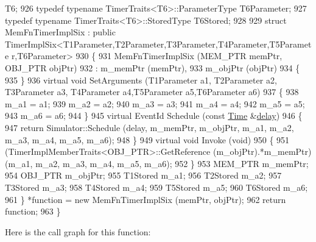 \begin{DoxyCode}
       T6;
926   \textcolor{keyword}{typedef} \textcolor{keyword}{typename} TimerTraits<T6>::ParameterType T6Parameter;
927   \textcolor{keyword}{typedef} \textcolor{keyword}{typename} TimerTraits<T6>::StoredType T6Stored;
928 
929   \textcolor{keyword}{struct }MemFnTimerImplSix : \textcolor{keyword}{public} TimerImplSix<T1Parameter,T2Parameter,T3Parameter,T4Parameter,T5Paramete
      r,T6Parameter>
930   \{
931     MemFnTimerImplSix (MEM\_PTR memPtr, OBJ\_PTR objPtr)
932       : m\_memPtr (memPtr),
933         m\_objPtr (objPtr)
934     \{
935     \}
936     \textcolor{keyword}{virtual} \textcolor{keywordtype}{void} SetArguments (T1Parameter a1, T2Parameter a2, T3Parameter a3, T4Parameter a4,T5Parameter 
      a5,T6Parameter a6)
937     \{
938       m\_a1 = a1;
939       m\_a2 = a2;
940       m\_a3 = a3;
941       m\_a4 = a4;
942       m\_a5 = a5;
943       m\_a6 = a6;
944     \}
945     \textcolor{keyword}{virtual} EventId Schedule (\textcolor{keyword}{const} \hyperlink{namespacens3_1_1TracedValueCallback_a7ffd3e7c142ffe7c8a1d2db9b8de38ec}{Time} &\hyperlink{lte_2model_2fading-traces_2fading__trace__generator_8m_a7964e6aa8f61a9d28973c8267a606ad8}{delay})
946     \{
947       \textcolor{keywordflow}{return} Simulator::Schedule (delay, m\_memPtr, m\_objPtr, m\_a1, m\_a2, m\_a3, m\_a4, m\_a5, m\_a6);
948     \}
949     \textcolor{keyword}{virtual} \textcolor{keywordtype}{void} Invoke (\textcolor{keywordtype}{void})
950     \{
951       (TimerImplMemberTraits<OBJ\_PTR>::GetReference (m\_objPtr).*m\_memPtr)(m\_a1, m\_a2, m\_a3, m\_a4, m\_a5, 
      m\_a6);
952     \}
953     MEM\_PTR m\_memPtr;
954     OBJ\_PTR m\_objPtr;
955     T1Stored m\_a1;
956     T2Stored m\_a2;
957     T3Stored m\_a3;
958     T4Stored m\_a4;
959     T5Stored m\_a5;
960     T6Stored m\_a6;
961   \} *\textcolor{keyword}{function} = \textcolor{keyword}{new} MemFnTimerImplSix (memPtr, objPtr);
962   \textcolor{keywordflow}{return} \textcolor{keyword}{function};
963 \}
\end{DoxyCode}


Here is the call graph for this function\+:


